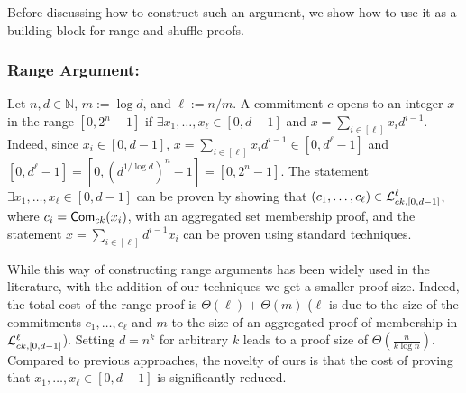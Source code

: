 Before discussing how to construct such an argument, we show how to use it as a building block for range and shuffle proofs.  
\subsubsection{Range Argument:}
Let $n,d\in\mathbb{N}$, $m:=\log d$, and $\ell:=n/m$. A commitment $c$ opens to an integer $x$ in the range $[0,2^n-1]$ if $\exists x_1,\ldots,x_\ell \in[0,d-1]$ and  $x=\sum_{i\in[\ell]}x_id^{i-1}$. Indeed, since $x_i\in[0,d-1]$,
$
x  =  \sum_{i\in[\ell]} x_i d^{i-1}
   \in  [0,d^\ell-1]$ and  $[0,d^\ell-1]=[0,(d^{1/\log d})^n-1] = [0,2^n-1].
$
The statement $\exists x_1,\ldots,x_\ell \in[0,d-1]$ can be proven by showing that $(c_1,\ldots,c_\ell)\in\mathcal{L}_{ck,[0,d-1]}^\ell$, where $c_i=\mathsf{Com}_{ck}(x_i)$, with an aggregated set membership proof, and the statement $x=\sum_{i\in[\ell]}d^{i-1}x_i$ can be proven using standard techniques. 

While this way of constructing range arguments has been widely used in the literature, with the addition of our techniques we get a smaller proof size. Indeed, the total cost of the range proof is $\Theta(\ell)+\Theta(m)$ ($\ell$ is due to the size of the commitments $c_1,\ldots,c_\ell$ and $m$ to the size of an aggregated proof of membership in $\mathcal{L}_{ck,[0,d-1]}^\ell$).  Setting $d=n^{k}$ for arbitrary $k$ leads to a proof size of $\Theta(\frac{n}{k \log n})$. Compared to previous approaches, the novelty of ours is that the cost of proving that $x_1,\ldots,x_\ell\in[0,d-1]$ is significantly reduced.
